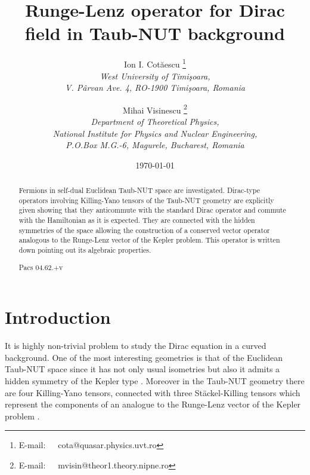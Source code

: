 \documentclass[a4paper,12pt]{article}
\begin{document}
\title{Runge-Lenz operator for Dirac field in 
Taub-NUT background}

\author{Ion I. Cot\u aescu \thanks{E-mail:~~~cota@quasar.physics.uvt.ro}\\ 
{\small \it West University of Timi\c soara,}\\
       {\small \it V. P\^ arvan Ave. 4, RO-1900 Timi\c soara, Romania}
\and
Mihai Visinescu \thanks{E-mail:~~~mvisin@theor1.theory.nipne.ro}\\
{\small \it Department of Theoretical Physics,}\\
{\small \it National Institute for Physics and Nuclear Engineering,}\\
{\small \it P.O.Box M.G.-6, Magurele, Bucharest, Romania}}
\date{\today}

\maketitle

\begin{abstract}
Fermions in \coordHE{} self-dual Euclidean Taub-NUT space are investigated. 
Dirac-type operators involving Killing-Yano tensors of the Taub-NUT 
geometry are explicitly given showing that they anticommute with the 
standard Dirac operator and commute with the Hamiltonian  as it is 
expected. They are connected with the hidden symmetries of the space 
allowing the construction of a conserved vector operator analogous to 
the Runge-Lenz vector of the Kepler problem. This operator is written 
down pointing out its algebraic properties.  

Pacs 04.62.+v

\end{abstract}


\section{Introduction}

It is highly non-trivial problem to study the Dirac equation in a curved 
background. One of the most interesting  geometries is that of the Euclidean 
Taub-NUT space  since it has not only usual isometries but also it admits a 
hidden symmetry of the Kepler type  \cite{GM,GRFH}. Moreover in the Taub-NUT 
geometry there are four Killing-Yano tensors, connected with three 
St\" ackel-Killing tensors  which represent the components of an analogue to 
the Runge-Lenz vector of the Kepler problem \cite{GRFH,vH1,VV,MV}.
\end{document}
